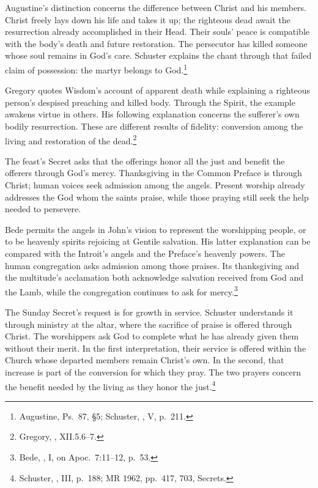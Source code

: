 Augustine's distinction concerns the difference between Christ and his
members. Christ freely lays down his life and takes it up; the righteous
dead await the resurrection already accomplished in their Head. Their
souls' peace is compatible with the body's death and future restoration.
The persecutor has killed someone whose soul remains in God's care.
Schuster explains the chant through that failed claim of
possession: the martyr belongs to God.\footnote{Augustine, Ps.~87,
\S5; Schuster, , V, p.~211.}

Gregory quotes Wisdom's account of apparent death while explaining a
righteous person's despised preaching and killed body. Through the
Spirit, the example awakens virtue in others. His following explanation
concerns the sufferer's own bodily resurrection. These are different
results of fidelity: conversion among the living and restoration of
the dead.\footnote{Gregory, , XII.5.6--7.}

The feast's Secret asks that the offerings honor all the just and benefit
the offerers through God's mercy. Thanksgiving in the Common Preface
is through Christ; human voices seek admission among the angels. Present
worship already addresses the God whom the saints praise, while those
praying still seek the help needed to persevere.

Bede permits the angels in John's vision to represent the worshipping
people, or to be heavenly spirits rejoicing at Gentile salvation.
His latter explanation can be compared with the Introit's angels and
the Preface's heavenly powers. The human congregation asks admission
among those praises. Its thanksgiving and the multitude's acclamation
both acknowledge salvation received from God and the Lamb, while
the congregation continues to ask for mercy.\footnote{Bede,
, I, on Apoc.~7:11--12, p.~53.}

The Sunday Secret's request is for growth in service. Schuster understands
it through ministry at the altar, where the sacrifice of praise is offered
through Christ. The worshippers ask God to complete what he has already
given them without their merit. In the first interpretation, their service
is offered within the Church whose departed members remain Christ's own.
In the second, that increase is part of the conversion for which they pray.
The two prayers concern the benefit needed by the living as they honor
the just.\footnote{Schuster, , III, p.~188;
MR 1962, pp.~417, 703, Secrets.}

